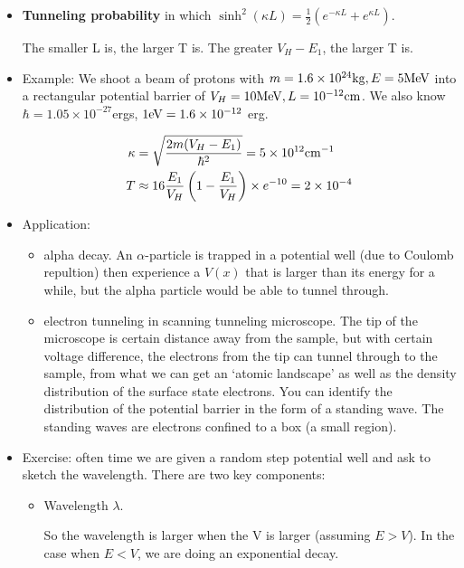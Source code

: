 \documentclass{school-22.101-notes}
\begin{document}
\begin{itemize}
\item \textbf{Tunneling probability}
in which $\sinh^2 (\kappa L) = \frac{1}{2} ( e^{-\kappa L} + e^{\kappa L})$. 

The smaller L is, the larger T is. The greater $V_H - E_1$, the larger T is. 

\item Example: We shoot a beam of protons with $m = 1.6 \times 10^{24} \mathrm{kg}, E = 5 \mathrm{MeV}$ into a rectangular potential barrier of $V_H = 10 \mathrm{MeV}, L = 10^{-12} \mathrm{cm}$. We also know $\hbar = 1.05 \times 10^{-27} $ergs, $1\mathrm{eV} = 1.6 \times 10^{-12}$ erg.

\begin{align}
\kappa &= \sqrt{\frac{2 m (V_H - E_1)}{\hbar^2}} = 5 \times 10^{12} \mathrm{cm}^{-1} \\
T &\approx 16 \frac{E_1}{V_H} \left( 1 - \frac{E_1}{V_H} \right) \times e^{-10} = 2 \times 10^{-4} \\
\end{align}

\item Application: 
\begin{itemize}
\item alpha decay. An $\alpha$-particle is trapped in a potential well (due to Coulomb repultion) then experience a $V(x)$ that is larger than its energy for a while, but the alpha particle would be able to tunnel through. 

\item electron tunneling in scanning tunneling microscope. The tip of the microscope is certain distance away from the sample, but with certain voltage difference, the electrons from the tip can tunnel through to the sample, from what we can get an `atomic landscape' as well as the density distribution of the surface state electrons. You can identify the distribution of the potential barrier in the form of a standing wave. The standing waves are electrons confined to a box (a small region). 
\end{itemize}

\item Exercise: often time we are given a random step potential well and ask to sketch the wavelength. There are two key components: 

    \begin{itemize}
    \item Wavelength $\lambda$. 
    
    So the wavelength is larger when the V is larger (assuming $E > V$). In the case when $E<V$, we are doing an exponential decay.  
    

\end{itemize}
\end{itemize}
\end{document}
